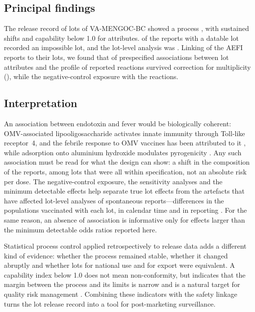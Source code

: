 \documentclass[11pt]{article}
\begin{document}
\subsection{Principal findings}\label{sec:d-principal}
The release record of \PTNLots{} lots of VA-MENGOC-BC showed a process
\PTWithinSpecPhrase, with \PTNChangepoints{} sustained shifts and capability below 1.0 for
\PTNAttrPpkBelowOne{} attributes. \PTLotInconsistentPct{} of the reports with a datable lot recorded
an impossible lot, and the lot-level analysis was \PTFeasibilityWord. Linking \PTLinkRate{} of the
AEFI reports to their lots, we found
that \PTNSignificantFDR{} of \PTNPrimaryTests{} prespecified associations between lot attributes
and the profile of reported reactions survived correction for multiplicity (\PTSignificantList),
while the negative-control exposure \PTNegControlWord{} with the reactions.

\subsection{Interpretation}\label{sec:d-interpretation}
An association between endotoxin and fever would be biologically coherent: OMV-associated
lipooligosaccharide activates innate immunity through Toll-like receptor~4, and the febrile
response to OMV vaccines has been attributed to it \cite{Sheerin2019,Zariri2016}, while adsorption
onto aluminium hydroxide modulates pyrogenicity \cite{Rosenqvist1998}. Any such association must be
read for what the design can show: a shift in the composition of the reports, among lots that were
all within specification, not an absolute risk per dose. The negative-control exposure, the
sensitivity analyses and the minimum detectable effects help separate true lot effects from the
artefacts that have affected lot-level analyses of spontaneous reports---differences in the
populations vaccinated with each lot, in calendar time and in reporting
\cite{Hviid2023,Scott2023}. For the same reason, an absence of association is informative only for
effects larger than the minimum detectable odds ratios reported here.

Statistical process control applied retrospectively to release data adds a different kind of
evidence: whether the process remained stable, whether it changed abruptly and whether lots for
national use and for export were equivalent. A capability index below 1.0 does not mean
non-conformity, but indicates that the margin between the process and its limits is narrow and is a
natural target for quality risk management \cite{ICHQ9R1,ICHQ10}. Combining these indicators with
the safety linkage turns the lot release record into a tool for post-marketing surveillance.
\end{document}
